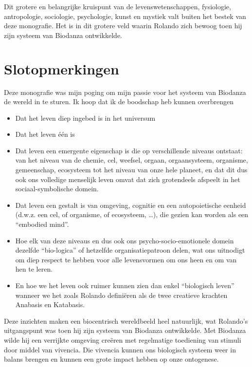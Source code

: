 \documentclass[
  11pt,
]{book}
\begin{document}
Dit grotere en belangrijke kruispunt van de levenswetenschappen, fysiologie, antropologie, sociologie, psychologie, kunst en mystiek valt buiten het bestek van deze monografie. Het is in dit grotere veld waarin Rolando zich bewoog toen hij zijn systeem van Biodanza ontwikkelde.

\hypertarget{slotopmerkingen}{%
\chapter{Slotopmerkingen}\label{slotopmerkingen}}

Deze monografie was mijn poging om mijn passie voor het systeem van Biodanza de wereld in te sturen. Ik hoop dat ik de boodschap heb kunnen overbrengen

\begin{itemize}
\item
  Dat het leven diep ingebed is in het universum
\item
  Dat het leven één is
\item
  Dat leven een emergente eigenschap is die op verschillende niveaus ontstaat: van het niveau van de chemie, cel, weefsel, orgaan, orgaansysteem, organisme, gemeenschap, ecosysteem tot het niveau van onze hele planeet, en dat dit dus ook ons volledige menselijk leven omvat dat zich grotendeels afspeelt in het sociaal-symbolische domein.
\item
  Dat leven een gestalt is van omgeving, cognitie en een autopoietische eenheid (d.w.z. een cel, of organisme, of ecosysteem, \ldots), die gezien kan worden als een ``embodied mind''.
\item
  Hoe elk van deze niveaus en dus ook ons psycho-socio-emotionele domein dezelfde ``bio-logica'' of hetzelfde organisatiepatroon delen, wat ons uitnodigt om diep respect te hebben voor alle levensvormen om ons heen en om van hen te leren.
\item
  En hoe we het leven ook ruimer kunnen zien dan enkel ``biologisch leven'' wanneer we het zoals Rolando definiëren als de twee creatieve krachten Anabasis en Katabasis.
\end{itemize}

Deze inzichten maken een biocentrisch wereldbeeld heel natuurlijk, wat Rolando's uitgangspunt was toen hij zijn systeem van Biodanza ontwikkelde. Met Biodanza wilde hij een verrijkte omgeving creëren met regelmatige toediening van stimuli door middel van vivencia. Die vivencia kunnen ons biologisch systeem weer in balans brengen en kunnen een grote impact hebben op onze ontogenese.
\end{document}
